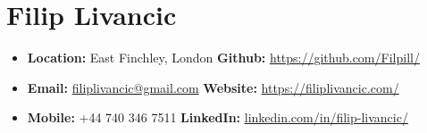 \documentclass[a4paper,9pt]{article}
\date{}
\begin{document}
\section*{Filip Livancic}

\begin{itemize}[noitemsep]
    \item[] \faMapO \hspace{1mm} \textbf{Location:} \hspace{0.2mm}East Finchley, London 
        \hspace{41.5mm} \faGithub \hspace{2mm} \textbf{Github:} \hspace{2,5mm} \url{https://github.com/Filpill/}
    \item[] \faEnvelope \hspace{1.6mm} \textbf{Email:} \hspace{3.5mm} \href{mailto:filiplivancic@gmail.com}{filiplivancic@gmail.com} 
        \hspace{38mm} \faGlobe \hspace{2mm} \textbf{Website:} \hspace{1.2mm} \url{https://filiplivancic.com/}
    \item[] \faPhone \hspace{2.2mm} \textbf{Mobile:} \hspace{1.5mm} +44 740 346 7511
        \hspace{46mm} \faLinkedinSquare \hspace{2mm} \textbf{LinkedIn:} \hspace{0.5mm}\url{linkedin.com/in/filip-livancic/}
\end{itemize}
\end{document}
